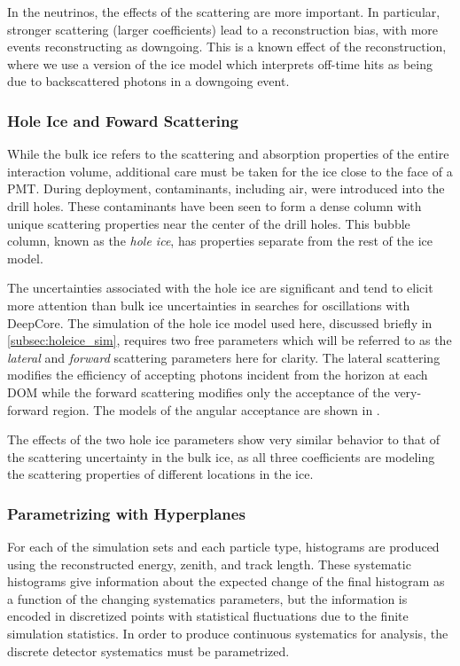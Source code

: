 In the neutrinos, the effects of the scattering are more important.
In particular, stronger scattering (larger coefficients) lead to a reconstruction bias, with more events reconstructing as downgoing.
This is a known effect of the reconstruction, where we use a version of the ice model which interprets off-time hits as being due to backscattered photons in a downgoing event.


\subsubsection{Hole Ice and Foward Scattering}
\label{subsubsec:holeice}
While the bulk ice refers to the scattering and absorption properties of the entire interaction volume, additional care must be taken for the ice close to the face of a PMT.
During deployment, contaminants, including air, were introduced into the drill holes.
These contaminants have been seen to form a dense column with unique scattering properties near the center of the drill holes.
This bubble column, known as the \emph{hole ice}, has properties separate from the rest of the ice model.

The uncertainties associated with the hole ice are significant and tend to elicit more attention than bulk ice uncertainties in searches for oscillations with DeepCore.
The simulation of the hole ice model used here, discussed briefly in \ref{subsec:holeice_sim}, requires two free parameters which will be referred to as the \emph{lateral} and \emph{forward} scattering parameters here for clarity.
The lateral scattering modifies the efficiency of accepting photons incident from the horizon at each DOM while the forward scattering modifies only the acceptance of the very-forward region.
The models of the angular acceptance are shown in .

The effects of the two hole ice parameters show very similar behavior to that of the scattering uncertainty in the bulk ice, as all three coefficients are modeling the scattering properties of different locations in the ice.

\label{subsubsec:hyperplanes}
\subsubsection{Parametrizing with Hyperplanes}
For each of the simulation sets and each particle type, histograms are produced using the reconstructed energy, zenith, and track length. 
These systematic histograms give information about the expected change of the final histogram as a function of the changing systematics parameters, but the information is encoded in discretized points with statistical fluctuations due to the finite simulation statistics.
In order to produce continuous systematics for analysis, the discrete detector systematics must be parametrized.

